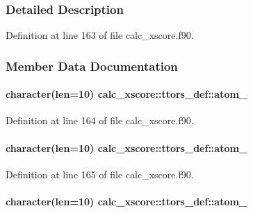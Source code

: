 \subsubsection{Detailed Description}


Definition at line 163 of file calc\-\_\-xscore.\-f90.



\subsubsection{Member Data Documentation}
\hypertarget{structcalc__xscore_1_1ttors__def_aaf870257e65e504e129e6f5c14ecbac8}{
\paragraph[{atom\-\_\-1}]{\setlength{\rightskip}{0pt plus 5cm}character(len=10) calc\-\_\-xscore\-::ttors\-\_\-def\-::atom\-\_}}\label{structcalc__xscore_1_1ttors__def_aaf870257e65e504e129e6f5c14ecbac8}


Definition at line 164 of file calc\-\_\-xscore.\-f90.

\hypertarget{structcalc__xscore_1_1ttors__def_a616996f493c0adac0e595557a99d9e64}{
\paragraph[{atom\-\_\-2}]{\setlength{\rightskip}{0pt plus 5cm}character(len=10) calc\-\_\-xscore\-::ttors\-\_\-def\-::atom\-\_}}\label{structcalc__xscore_1_1ttors__def_a616996f493c0adac0e595557a99d9e64}


Definition at line 165 of file calc\-\_\-xscore.\-f90.

\hypertarget{structcalc__xscore_1_1ttors__def_af46d71a1fabd177a2bdbb99155c85e86}{
\paragraph[{atom\-\_\-3}]{\setlength{\rightskip}{0pt plus 5cm}character(len=10) calc\-\_\-xscore\-::ttors\-\_\-def\-::atom\-\_}}\label{structcalc__xscore_1_1ttors__def_af46d71a1fabd177a2bdbb99155c85e86}


